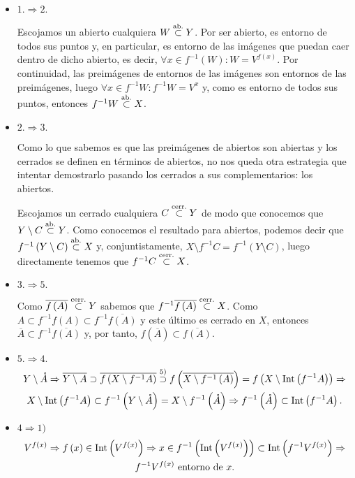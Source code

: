 \begin{demo}
\begin{itemize}
    \item $1. \Rightarrow 2.$
    
    Escojamos un abierto cualquiera $W \stackrel{\text{ab.}}{\subset} Y$. Por ser abierto, es entorno de todos sus puntos y, en particular, es entorno de las imágenes que puedan caer dentro de dicho abierto, es decir, $\forall x \in f^{-1} (W) : W = V^{f(x)}$. Por continuidad, las preimágenes de entornos de las imágenes son entornos de las preimágenes, luego $\forall x \in f^{-1} W : f^{-1}W = V^x$ y, como es entorno de todos sus puntos, entonces $f^{-1} W \stackrel{\text{ab.}}{\subset} X$.
    \item $2. \Rightarrow 3.$
    
    Como lo que sabemos es que las preimágenes de abiertos son abiertas y los cerrados se definen en términos de abiertos, no nos queda otra estrategia que intentar demostrarlo pasando los cerrados a sus complementarios: los abiertos.
    
    Escojamos un cerrado cualquiera $C \stackrel{\text{cerr.}}{\subset} Y$ de modo que conocemos que $Y \setminus C \stackrel{\text{ab.}}{\subset} Y$. Como conocemos el resultado para abiertos, podemos decir que $f^{-1}\left( Y\setminus C \right) \stackrel{\text{ab.}}{\subset} X$ y, conjuntistamente, $X \setminus f^{-1}C = f^{-1}\left( Y\setminus C \right)$, luego directamente tenemos que $f^{-1}C \stackrel{\text{cerr.}}{\subset} X$. 
    \item $3. \Rightarrow 5.$
    
    Como $\overline{f\left( A \right)} \stackrel{\text{cerr.}}{\subset} Y$ sabemos que $f^{-1}\overline{f\left( A \right)} \stackrel{\text{cerr.}}{\subset} X$. Como $A\subset f^{-1}f(A) \subset f^{-1}\overline{f\left( A \right)}$ y este último es cerrado en $X$, entonces $\overline{A}\subset f^{-1}\overline{f\left( A \right)}$ y, por tanto, $f\left( \overline{A} \right) \subset \overline{f\left( A \right)}$.
    \item $5. \Rightarrow 4.$
    \begin{gather*}
        Y \setminus \mathring{A}\Rightarrow \overline{Y\setminus A} \supset \overline{f\left( X \setminus f^{-1}A \right)} \stackrel{5)}{\supset} f\left( \overline{X \setminus f^{-1}\left( A \right)} \right) = f\left( X \setminus \operatorname{Int}\left( f^{-1}A \right) \right) \Rightarrow\\
        X \setminus \operatorname{Int}\left( f^{-1}A \right) \subset f^{-1}\left( Y\setminus \mathring{A} \right) = X \setminus f^{-1}\left( \mathring{A} \right)\Rightarrow f^{-1}\left( \mathring{A} \right) \subset \operatorname{Int}\left( f^{-1}A \right) 
    .\end{gather*}

    \item $4 \Rightarrow 1)$
    \begin{gather*}
        V^{f\left( x \right)} \Rightarrow f\left( x \right) \in \operatorname{Int}\left( V^{f\left( x \right)} \right) \Rightarrow x \in f^{-1}\left( \operatorname{Int}\left( V^{f\left( x \right)} \right) \right) \subset \operatorname{Int}\left( f^{-1}V^{f\left( x \right)} \right) \Rightarrow \\
        f^{-1}V^{f\left( x \right) } \text{ entorno de } x.
    \end{gather*}
\end{itemize}
\end{demo}


